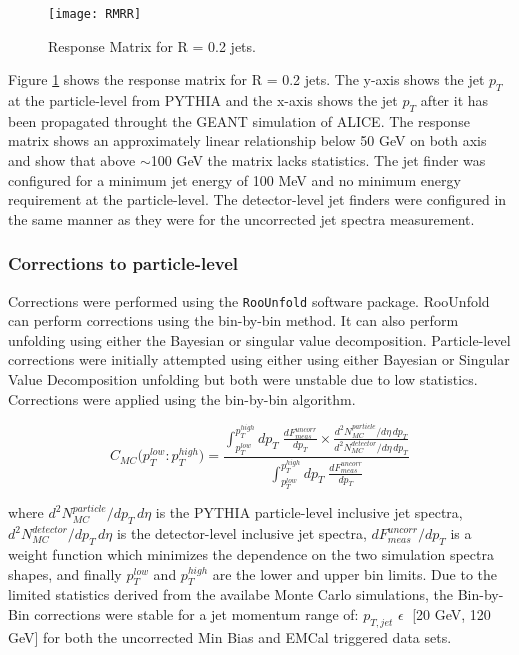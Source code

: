\begin{figure}[b!]
\texttt{[image: RMRR]}
\centering
\caption{Response Matrix for R = 0.2 jets.}
\label{fig:response}
\end{figure}

Figure \ref{fig:response} shows the response matrix for R = 0.2 jets.  The y-axis shows the jet $p_{T}$ at the particle-level from PYTHIA and the x-axis shows the jet $p_{T}$ after it has been propagated throught the GEANT simulation of ALICE.  The response matrix shows an approximately linear relationship below 50 GeV on both axis and show that above $\sim$100 GeV the matrix lacks statistics.  The jet finder was configured for a minimum jet energy of 100 MeV and no minimum energy requirement at the particle-level.  The detector-level jet finders were configured in the same manner as they were for the uncorrected jet spectra measurement.

\subsubsection{Corrections to particle-level}

Corrections were performed using the \verb+RooUnfold+\cite{Adye:2011gm} software package.  RooUnfold can perform corrections using the bin-by-bin method.  It can also perform unfolding using either the Bayesian or singular value decomposition.  Particle-level corrections were initially attempted using either using either Bayesian or Singular Value Decomposition unfolding but both were unstable due to low statistics. Corrections were applied using the bin-by-bin\cite{Cowan:2002in} algorithm. 

\begin{equation}
C_{MC} \big( p_{T}^{low} : p_{T}^{high} \big) =  \frac{  \int^{p_{T}^{high}}_{p_{T}^{low}} dp_{T} \; \frac{dF^{uncorr}_{meas}}{dp_{T}} \times \frac{d^{2}N^{particle}_{MC}/d\eta \, dp_{T}}{d^{2}N^{detector}_{MC}/d\eta \, dp_{T}}  } { \int^{p_{T}^{high}}_{p_{T}^{low}} dp_{T} \; \frac{dF^{uncorr}_{meas}}{dp_{T}} }
\label{eq:binbybin}
\end{equation}

\noindent
where $d^{2}N^{particle}_{MC}/dp_{T} \, d\eta$ is the PYTHIA particle-level inclusive jet spectra, $d^{2}N^{detector}_{MC}/dp_{T} \, d\eta$ is the detector-level inclusive jet spectra, $dF^{uncorr}_{meas} / dp_{T}$ is a weight function which minimizes the dependence on the two simulation spectra shapes, and finally $p_{T}^{low}$ and $p_{T}^{high}$ are the lower and upper bin limits.  Due to the limited statistics derived from the availabe Monte Carlo simulations, the Bin-by-Bin corrections were stable for a jet momentum range of: $p_{T,jet} \, \, \epsilon \;$ [20 GeV, 120 GeV] for both the uncorrected Min Bias and EMCal triggered data sets.  

